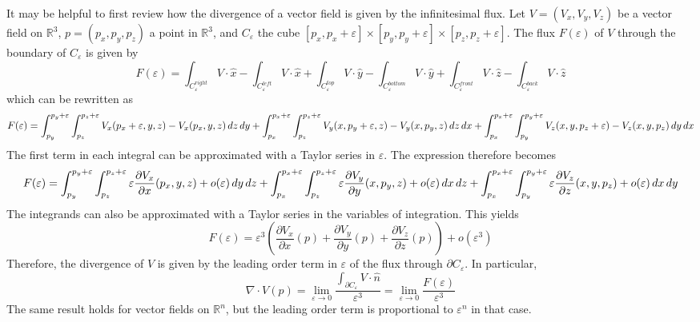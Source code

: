 \documentclass[12pt]{article}
\newcommand{\R}{\mathbb{R}}
\newcommand{\diff}{\mathop{}\!d}
\begin{document}
It may be helpful to first review how the divergence of a vector field is given by the infinitesimal flux. Let $V = (V_x, V_y, V_z)$ be a vector field on $\R^3$, $p = (p_x, p_y, p_z)$ a point in $\R^3$, and $C_\varepsilon$ the cube $[p_x, p_x+\varepsilon] \times [p_y, p_y+\varepsilon] \times [p_z, p_z + \varepsilon]$. The flux $F(\varepsilon)$ of $V$ through the boundary of $ C_\varepsilon$ is given by
\begin{dmath*}
F(\varepsilon) = \int_{C_\varepsilon^{right}} V \cdot \hat x -\int_{C_\varepsilon^{left}} V \cdot \hat x + \int_{C_\varepsilon^{top}} V \cdot \hat y - \int_{C_\varepsilon^{bottom}} V\cdot \hat y +  \int_{C_\varepsilon^{front}} V \cdot \hat z - \int_{C_\varepsilon^{back}} V \cdot \hat z
\end{dmath*}
which can be rewritten as
\begin{dmath*}
F(\varepsilon) = \int_{p_y}^{p_y+\varepsilon} \int_{p_z}^{p_z+ \varepsilon} V_x(p_x + \varepsilon, y, z) - V_x(p_x, y, z) \diff z \diff y \\
+ \int_{p_x}^{p_x+\varepsilon} \int_{p_z}^{p_z+\varepsilon} V_y (x, p_y + \varepsilon, z) - V_y(x, p_y, z) \diff z \diff x\\
+\int_{p_x}^{p_x+\varepsilon} \int_{p_y}^{p_y+\varepsilon} V_z(x, y, p_z + \varepsilon) - V_z(x, y, p_z) \diff y \diff x
\end{dmath*}
The first term in each integral can be approximated with a Taylor series in $\varepsilon$. The expression therefore becomes
\begin{dmath*}
F(\varepsilon) = \int_{p_y}^{p_y+\varepsilon} \int_{p_z}^{p_z+ \varepsilon} \varepsilon \frac{\partial V_x} {\partial x} (p_x, y, z) + o(\varepsilon)\diff y \diff z
+ \int_{p_x}^{p_x+\varepsilon} \int_{p_z}^{p_z+\varepsilon} \varepsilon \frac{\partial V_y}{\partial y}(x, p_y, z) +o(\varepsilon)\diff x \diff z\\
+\int_{p_x}^{p_x+\varepsilon} \int_{p_y}^{p_y+\varepsilon} \varepsilon \frac{\partial V_z}{\partial z} (x, y, p_z) + o(\varepsilon) \diff x \diff y
\end{dmath*}
The integrands can also be approximated with a Taylor series in the variables of integration. This yields
\begin{dmath*}
F(\varepsilon) = \varepsilon^3 \left (\frac{\partial V_x}{\partial x} (p) + \frac{\partial V_y}{\partial y} (p) + \frac{\partial V_z}{\partial z} (p) \right) + o(\varepsilon^3)
\end{dmath*}
Therefore, the divergence of $V$ is given by the leading order term in $\varepsilon$ of the flux through $\partial C_\varepsilon$. In particular,
$$
\nabla \cdot V (p) = \lim_{\varepsilon \to 0}\frac{ \int_{\partial C_\varepsilon} V \cdot \hat n}{\varepsilon^3} = \lim_{\varepsilon \to 0} \frac{F(\varepsilon)}{\varepsilon^3}
$$
The same result holds for vector fields on $\R^n$, but the leading order term is proportional to $\varepsilon ^n$ in that case.
\end{document}
